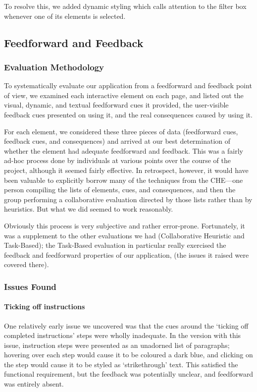 To resolve this, we added dynamic styling which calls attention to the
filter box whenever one of its elements is selected.

\subsection{Feedforward and Feedback}

\subsubsection{Evaluation Methodology}

To systematically evaluate our application from a feedforward and
feedback point of view, we examined each interactive element on each
page, and listed out the visual, dynamic, and textual feedforward cues
it provided, the user-visible feedback cues presented on using
it, and the real consequences caused by using it.

For each element, we considered these three pieces of data
(feedforward cues, feedback cues, and consequences) and arrived at our
best determination of whether the element had adequate feedforward and
feedback. This was a fairly ad-hoc process done by individuals at
various points over the course of the project, although it seemed
fairly effective. In retrospect, however, it would have been valuable
to explicitly borrow many of the techniques from the CHE---one person
compiling the lists of elements, cues, and consequences, and then the
group performing a collaborative evaluation directed by those lists
rather than by heuristics. But what we did seemed to work reasonably.

Obviously this process is very subjective and rather
error-prone. Fortunately, it was a supplement to the other evaluations
we had (Collaborative Heuristic and Task-Based); the Task-Based
evaluation in particular really exercised the feedback and feedforward
properties of our application, (the issues it raised were covered
there).

\subsubsection{Issues Found}

\paragraph{Ticking off instructions}
One relatively early issue we uncovered was that the cues around the
`ticking off completed instructions' steps were wholly inadequate. In
the version with this issue, instruction steps were presented as an
unadorned list of paragraphs; hovering over each step would cause it
to be coloured a dark blue, and clicking on the step would cause it to
be styled as `strikethrough' text. This satisfied the functional
requirement, but the feedback was potentially unclear, and feedforward
was entirely absent.


